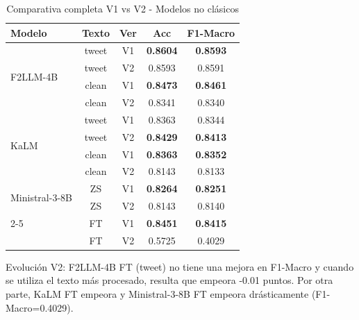 \documentclass[11pt,a4paper]{article}
\begin{document}
\begin{table}[h]
    \centering
    \small
    \begin{tabular}{@{}lcccc@{}}
        \toprule
        \textbf{Modelo} & \textbf{Texto} & \textbf{Ver} & \textbf{Acc}    & \textbf{F1-Macro} \\
        \midrule
        \multirow{4}{*}{F2LLM-4B}
                        & tweet          & V1           & \textbf{0.8604} & \textbf{0.8593}   \\
                        & tweet          & V2           & 0.8593          & 0.8591            \\
        \cmidrule(lr){2-5}
                        & clean          & V1           & \textbf{0.8473} & \textbf{0.8461}   \\
                        & clean          & V2           & 0.8341          & 0.8340            \\
        \midrule

        \multirow{4}{*}{KaLM}
                        & tweet          & V1           & 0.8363          & 0.8344            \\
                        & tweet          & V2           & \textbf{0.8429} & \textbf{0.8413}   \\
        \cmidrule(lr){2-5}
                        & clean          & V1           & \textbf{0.8363} & \textbf{0.8352}   \\
                        & clean          & V2           & 0.8143          & 0.8133            \\
        \midrule
        \multirow{2}{*}{Ministral-3-8B}
                        & ZS             & V1           & \textbf{0.8264} & \textbf{0.8251}   \\
                        & ZS             & V2           & 0.8143          & 0.8140            \\
        \cmidrule(lr){2-5}
                        & FT             & V1           & \textbf{0.8451} & \textbf{0.8415}   \\
                        & FT             & V2           & 0.5725          & 0.4029            \\
        \bottomrule
    \end{tabular}
    \caption{Comparativa completa V1 vs V2 - Modelos no clásicos}
    \label{tab:v1_v2_llm_full}
\end{table}

Evolución V2: F2LLM-4B FT (tweet) no tiene una mejora en F1-Macro y cuando se utiliza el texto más procesado, resulta que empeora -0.01 puntos. Por otra parte, KaLM FT empeora y Ministral-3-8B FT empeora drásticamente (F1-Macro=0.4029).
\end{document}
